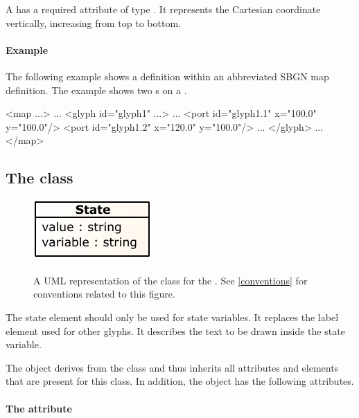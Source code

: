 A \Point has a required attribute  of type . It represents the Cartesian  coordinate vertically, increasing from top to bottom.

\paragraph{Example}

The following example shows a \Port definition within an abbreviated SBGN map definition. The example shows two \Port{}s on a \Glyph.

\begin{example}
<map ...>
    ...
    <glyph id="glyph1" ...>
        ...
        <port id="glyph1.1" x="100.0" y="100.0"/>
        <port id="glyph1.2" x="120.0" y="100.0"/>
        ...
    </glyph>
    ...
</map>
\end{example}


\subsection{The  class}
\label{state-class}

\begin{figure}[ht!]
  \centering
  \includegraphics[scale=1.0]{figures/sbgnml_state_uml.pdf}\\
\caption{A UML representation of the \State class for the
\SbgnmlPackage. See \ref{conventions} for conventions related to this
figure. }
  \label{fig:sbgnml_state_uml}
\end{figure}

The state element should only be used for state variables. It replaces the label element used for other glyphs. It describes the text to be drawn inside the state variable.

The \State object derives from the \SbgnBase class and thus inherits all
attributes and elements that are present for this class.
In addition, the \State object has the following attributes.

\paragraph{The \fixttspace{} attribute}

